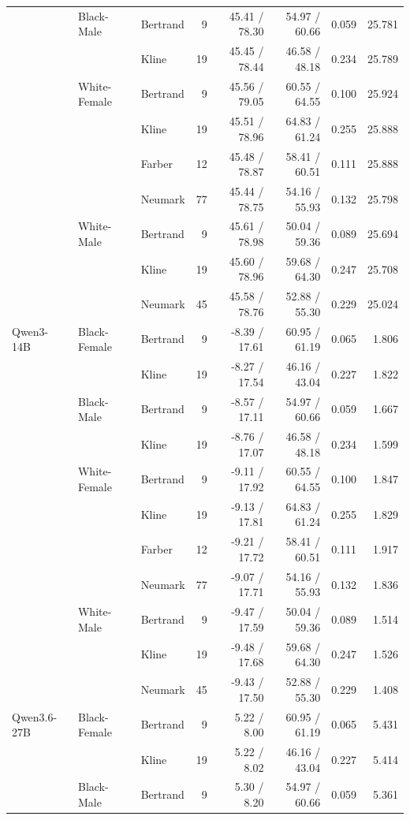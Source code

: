 \begin{longtable}{@{}lllrrrrr@{}}
 & Black-Male & Bertrand & 9 & 45.41 / 78.30 & 54.97 / 60.66 & 0.059 & 25.781 \\
 &  & Kline & 19 & 45.45 / 78.44 & 46.58 / 48.18 & 0.234 & 25.789 \\
 & White-Female & Bertrand & 9 & 45.56 / 79.05 & 60.55 / 64.55 & 0.100 & 25.924 \\
 &  & Kline & 19 & 45.51 / 78.96 & 64.83 / 61.24 & 0.255 & 25.888 \\
 &  & Farber & 12 & 45.48 / 78.87 & 58.41 / 60.51 & 0.111 & 25.888 \\
 &  & Neumark & 77 & 45.44 / 78.75 & 54.16 / 55.93 & 0.132 & 25.798 \\
 & White-Male & Bertrand & 9 & 45.61 / 78.98 & 50.04 / 59.36 & 0.089 & 25.694 \\
 &  & Kline & 19 & 45.60 / 78.96 & 59.68 / 64.30 & 0.247 & 25.708 \\
 &  & Neumark & 45 & 45.58 / 78.76 & 52.88 / 55.30 & 0.229 & 25.024 \\
\addlinespace
Qwen3-14B & Black-Female & Bertrand & 9 & -8.39 / 17.61 & 60.95 / 61.19 & 0.065 & 1.806 \\
 &  & Kline & 19 & -8.27 / 17.54 & 46.16 / 43.04 & 0.227 & 1.822 \\
 & Black-Male & Bertrand & 9 & -8.57 / 17.11 & 54.97 / 60.66 & 0.059 & 1.667 \\
 &  & Kline & 19 & -8.76 / 17.07 & 46.58 / 48.18 & 0.234 & 1.599 \\
 & White-Female & Bertrand & 9 & -9.11 / 17.92 & 60.55 / 64.55 & 0.100 & 1.847 \\
 &  & Kline & 19 & -9.13 / 17.81 & 64.83 / 61.24 & 0.255 & 1.829 \\
 &  & Farber & 12 & -9.21 / 17.72 & 58.41 / 60.51 & 0.111 & 1.917 \\
 &  & Neumark & 77 & -9.07 / 17.71 & 54.16 / 55.93 & 0.132 & 1.836 \\
 & White-Male & Bertrand & 9 & -9.47 / 17.59 & 50.04 / 59.36 & 0.089 & 1.514 \\
 &  & Kline & 19 & -9.48 / 17.68 & 59.68 / 64.30 & 0.247 & 1.526 \\
 &  & Neumark & 45 & -9.43 / 17.50 & 52.88 / 55.30 & 0.229 & 1.408 \\
\addlinespace
Qwen3.6-27B & Black-Female & Bertrand & 9 & 5.22 / 8.00 & 60.95 / 61.19 & 0.065 & 5.431 \\
 &  & Kline & 19 & 5.22 / 8.02 & 46.16 / 43.04 & 0.227 & 5.414 \\
 & Black-Male & Bertrand & 9 & 5.30 / 8.20 & 54.97 / 60.66 & 0.059 & 5.361 \\

\end{longtable}
